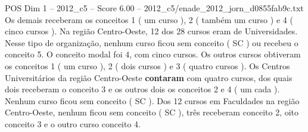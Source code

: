\begin{textsample}{POS Dim 1 – 2012\_c5 – Score 6.00 – 2012\_c5/enade\_2012\_jorn\_d0855fab9c.txt}
Os demais receberam os conceitos 1 ( um curso ), 2 ( também um curso ) e 4 ( cinco cursos ).
Na região Centro-Oeste, 12 dos 28 cursos eram de Universidades.
Nesse tipo de organização, nenhum curso ficou sem conceito ( SC ) ou recebeu o conceito 5.
O conceito modal foi 4, com cinco cursos.
Os outros cursos obtiveram os conceitos 1 ( um curso ), 2 ( dois cursos ) e 3 ( quatro cursos ).
Os Centros Universitários da região Centro-Oeste \textbf{contaram} com quatro cursos, dos quais dois receberam o conceito 3 e os outros dois os conceitos 2 e 4 ( um cada ).
Nenhum curso ficou sem conceito ( SC ).
Dos 12 cursos em Faculdades na região Centro-Oeste, nenhum ficou sem conceito ( SC ), três receberam conceito 2, oito conceito 3 e o outro curso conceito 4.

\end{textsample}
